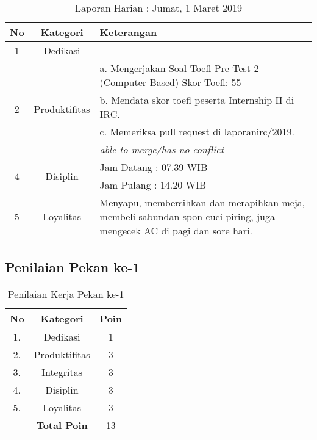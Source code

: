 \begin{table}[htp]
\begin{center}
\caption{Laporan Harian : Jumat, 1 Maret 2019}
\label{tab:lh010319}
\begin{tabularx}{\textwidth}{|l|l|X|}
\hline
\multicolumn{1}{|c|}{\textbf{No}} & \multicolumn{1}{c|}{\textbf{Kategori}} & \textbf{Keterangan} \\ \hline
\multicolumn{1}{|c|}{\multirow{1}{*}{1}} & \multicolumn{1}{c|}{\multirow{1}{*}{\parbox{2.5cm}{Dedikasi}}}
& - \\
\hline
\multicolumn{1}{|c|}{\multirow{4}{*}{2}} & \multicolumn{1}{c|}{\multirow{4}{*}{\parbox{2.5cm}{Produktifitas}}}
& a. Mengerjakan Soal Toefl Pre-Test 2 (Computer Based) Skor Toefl: 55\\
\multicolumn{1}{|c|}{\multirow{1}{*}{}} & \multicolumn{1}{c|}{\multirow{1}{*}{\parbox{2.5cm}{}}}
& b. Mendata skor toefl peserta Internship II di IRC.\\
\multicolumn{1}{|c|}{\multirow{1}{*}{}} & \multicolumn{1}{c|}{\multirow{1}{*}{\parbox{2.5cm}{}}}
& c. Memeriksa pull request di laporanirc/2019.\\
\hline
\multicolumn{1}{|c|}{\multirow{1}{*}{3}} & \multicolumn{1}{c|}{\multirow{1}{*}{\parbox{2.5cm}{Integritas}}}
& \textit{able to merge/has no conflict} \\
\hline
\multicolumn{1}{|c|}{\multirow{2}{*}{4}} & \multicolumn{1}{c|}{\multirow{2}{*}{\parbox{2.5cm}{Disiplin}}}
& Jam Datang : 07.39 WIB \\
\multicolumn{1}{|c|}{\multirow{1}{*}{}} & \multicolumn{1}{c|}{\multirow{1}{*}{\parbox{2.5cm}{}}}
& Jam Pulang : 14.20 WIB \\
\hline
\multicolumn{1}{|c|}{\multirow{3}{*}{5}} & \multicolumn{1}{c|}{\multirow{3}{*}{\parbox{2.5cm}{Loyalitas}}}
& Menyapu, membersihkan dan merapihkan meja, membeli sabundan spon cuci piring, juga mengecek AC di pagi dan sore hari.\\
\hline
\end{tabularx}
\end{center}
\end{table}

\subsection{Penilaian Pekan ke-1}

\begin{table}[htp]
\centering
\caption{Penilaian Kerja Pekan ke-1}
\label{tab:nm01}
\begin{tabular}{|c|c|c|}
\hline
\textbf{No} & \textbf{Kategori} & \textbf{Poin} \\ \hline
1. & Dedikasi & 1 \\ \hline
2. & Produktifitas & 3 \\ \hline
3. & Integritas & 3 \\ \hline
4. & Disiplin & 3 \\ \hline
5. & Loyalitas & 3 \\ \hline
 & \textbf{Total Poin} & 13 \\ \hline
\end{tabular}
\end{table}

